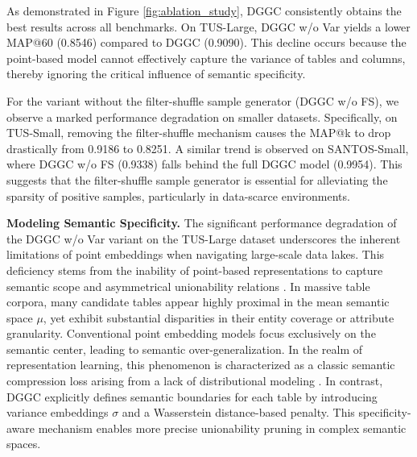 As demonstrated in Figure \ref{fig:ablation_study}, DGGC consistently obtains the best results across all benchmarks. On TUS-Large, DGGC w/o Var yields a lower MAP@60 (0.8546) compared to DGGC (0.9090). This decline occurs because the point-based model cannot effectively capture the variance of tables and columns, thereby ignoring the critical influence of semantic specificity.

For the variant without the filter-shuffle sample generator (DGGC w/o FS), we observe a marked performance degradation on smaller datasets. Specifically, on TUS-Small, removing the filter-shuffle mechanism causes the MAP@k to drop drastically from 0.9186 to 0.8251. A similar trend is observed on SANTOS-Small, where DGGC w/o FS (0.9338) falls behind the full DGGC model (0.9954). This suggests that the filter-shuffle sample generator is essential for alleviating the sparsity of positive samples, particularly in data-scarce environments.


\noindent\textbf{Modeling Semantic Specificity.} The significant performance degradation of the DGGC w/o Var variant on the TUS-Large dataset underscores the inherent limitations of point embeddings when navigating large-scale data lakes. This deficiency stems from the inability of point-based representations to capture semantic scope and asymmetrical unionability relations \cite{vilnis2014word}. In massive table corpora, many candidate tables appear highly proximal in the mean semantic space $\mu$, yet exhibit substantial disparities in their entity coverage or attribute granularity. Conventional point embedding models focus exclusively on the semantic center, leading to semantic over-generalization. In the realm of representation learning, this phenomenon is characterized as a classic semantic compression loss arising from a lack of distributional modeling \cite{muzellec2018generalizing}. In contrast, DGGC explicitly defines semantic boundaries for each table by introducing variance embeddings $\sigma$ and a Wasserstein distance-based penalty. This specificity-aware mechanism enables more precise unionability pruning in complex semantic spaces.

